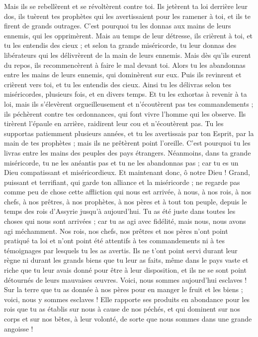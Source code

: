 \begin{multicols}{2}
Mais ils se rebellèrent et se révoltèrent contre toi. Ils jetèrent ta loi derrière leur dos, ils tuèrent tes prophètes qui les avertissaient pour les ramener à toi, et ils te firent de grands outrages.
C'est pourquoi tu les donnas aux mains de leurs ennemis, qui les opprimèrent. Mais au temps de leur détresse, ils crièrent à toi, et tu les entendis des cieux ; et selon ta grande miséricorde, tu leur donnas des libérateurs qui les délivrèrent de la main de leurs ennemis.
Mais dès qu'ils eurent du repos, ils recommencèrent à faire le mal devant toi. Alors tu les abandonnas entre les mains de leurs ennemis, qui dominèrent sur eux. Puis ils revinrent et crièrent vers toi, et tu les entendis des cieux. Ainsi tu les délivras selon tes miséricordes, plusieurs fois, et en divers temps.
Et tu les exhortas à revenir à ta loi, mais ils s'élevèrent orgueilleusement et n'écoutèrent pas tes commandements ; ils péchèrent contre tes ordonnances, qui font vivre l'homme qui les observe. Ils tirèrent l'épaule en arrière, raidirent leur cou et n'écoutèrent pas.
Tu les supportas patiemment plusieurs années, et tu les avertissais par ton Esprit, par la main de tes prophètes ; mais ils ne prêtèrent point l'oreille. C'est pourquoi tu les livras entre les mains des peuples des pays étrangers.
Néanmoins, dans ta grande miséricorde, tu ne les anéantis pas et tu ne les abandonnas pas ; car tu es un Dieu compatissant et miséricordieux.
Et maintenant donc, ô notre Dieu ! Grand, puissant et terrifiant, qui garde ton alliance et la miséricorde ; ne regarde pas comme peu de chose cette affliction qui nous est arrivée, à nous, à nos rois, à nos chefs, à nos prêtres, à nos prophètes, à nos pères et à tout ton peuple, depuis le temps des rois d'Assyrie jusqu'à aujourd'hui.
Tu as été juste dans toutes les choses qui nous sont arrivées ; car tu as agi avec fidélité, mais nous, nous avons agi méchamment.
Nos rois, nos chefs, nos prêtres et nos pères n'ont point pratiqué ta loi et n'ont point été attentifs à tes commandements ni à tes témoignages par lesquels tu les as avertis.
Ils ne t'ont point servi durant leur règne ni durant les grands biens que tu leur as faits, même dans le pays vaste et riche que tu leur avais donné pour être à leur disposition, et ils ne se sont point détournés de leurs mauvaises œuvres.
Voici, nous sommes aujourd'hui esclaves ! Sur la terre que tu as donnée à nos pères pour en manger le fruit et les biens ; voici, nous y sommes esclaves !
Elle rapporte ses produits en abondance pour les rois que tu as établis sur nous à cause de nos péchés, et qui dominent sur nos corps et sur nos bêtes, à leur volonté, de sorte que nous sommes dans une grande angoisse !

\end{multicols}
